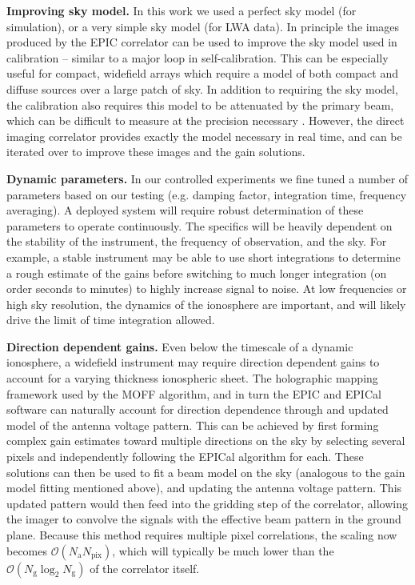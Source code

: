 \documentclass[a4paper,fleqn,usenatbib]{../mnras}
\newcommand{\Nant}{\ensuremath{N_{\mathrm{a}}}}
\newcommand{\Ng}{\ensuremath{N_{\mathrm{g}}}}
\begin{document}
\textbf{Improving sky model.} In this work we used a perfect sky model (for simulation), or a very simple sky model (for LWA data). In principle the images produced by the EPIC correlator can be used to improve the sky model used in calibration -- similar to a major loop in self-calibration. This can be especially useful for compact, widefield arrays which require a model of both compact and diffuse sources over a large patch of sky. In addition to requiring the sky model, the calibration also requires this model to be attenuated by the primary beam, which can be difficult to measure at the precision necessary \citep[e.g.][]{neb15,vir14,thy15b}. However, the direct imaging correlator provides exactly the model necessary in real time, and can be iterated over to improve these images and the gain solutions.

\textbf{Dynamic parameters.} In our controlled experiments we fine tuned a number of parameters based on our testing (e.g. damping factor, integration time, frequency averaging). A deployed system will require robust determination of these parameters to operate continuously. The specifics will be heavily dependent on the stability of the instrument, the frequency of observation, and the sky. For example, a stable instrument may be able to use short integrations to determine a rough estimate of the gains before switching to much longer integration (on order seconds to minutes) to highly increase signal to noise. At low frequencies or high sky resolution, the dynamics of the ionosphere are important, and will likely drive the limit of time integration allowed.

\textbf{Direction dependent gains.} Even below the timescale of a dynamic ionosphere, a widefield instrument may require direction dependent gains to account for a varying thickness ionospheric sheet. The holographic mapping framework used by the MOFF algorithm, and in turn the EPIC and EPICal software can naturally account for direction dependence through and updated model of the antenna voltage pattern. This can be achieved by first forming complex gain estimates toward multiple directions on the sky by selecting several pixels and independently following the EPICal algorithm for each. These solutions can then be used to fit a beam model on the sky (analogous to the gain model fitting mentioned above), and updating the antenna voltage pattern. This updated pattern would then feed into the gridding step of the correlator, allowing the imager to convolve the signals with the effective beam pattern in the ground plane. Because this method requires multiple pixel correlations, the scaling now becomes $\mathcal{O}(\Nant N_{\mathrm{pix}})$, which will typically be much lower than the $\mathcal{O}(\Ng \log_2 \Ng)$ of the correlator itself. 
\end{document}
